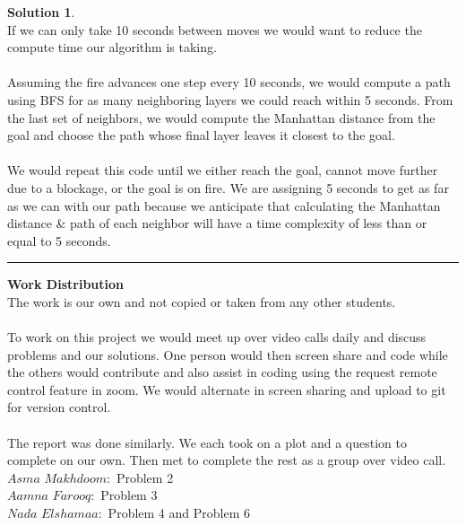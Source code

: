 \documentclass{article}
\theoremstyle{definition}
\def\fline{\rule{0.75\linewidth}{0.5pt}}
\newcommand{\finishline}{\vspace{-15pt}\begin{center}\fline\end{center}}
\newtheorem*{solution*}{Solution}
\newenvironment{solution}{\begin{solution*}}{{\finishline} \end{solution*}}
\begin{document}
\begin{solution} \hfill \\
     If we can only take 10 seconds between moves we would want to reduce the compute time our algorithm is taking. 
     \\\\
     Assuming the fire advances one step every 10 seconds, we would compute a path using BFS for as many neighboring layers we could reach within 5 seconds. From the last set of neighbors, we would compute the Manhattan distance from the goal and choose the path whose final layer leaves it closest to the goal. 
     \\\\
	 We would repeat this code until we either reach the goal, cannot move further due to a blockage, or the goal is on fire. 
	 We are assigning 5 seconds to get as far as we can with our path because we anticipate that calculating the Manhattan distance & path of each neighbor will have a time complexity of less than or equal to 5 seconds. 
	 
	 
\end{solution}

\textbf{Work Distribution}
\\
The work is our own and not copied or taken from any other students. 
\\\\
To work on this project we would meet up over video calls daily and discuss problems and our solutions. One person would then screen share and code while the others would contribute and also assist in coding using the request remote control feature in zoom. We would alternate in screen sharing and upload to git for version control. 
\\\\
The report was done similarly. We each took on a plot and a question to complete on our own. Then met to complete the rest as a group over video call. 
\\
$Asma$ $Makhdoom:$ Problem 2
\\
$Aamna$ $Farooq:$ Problem 3
\\
$Nada$ $Elshamaa:$ Problem 4 and Problem 6
\\
\smallskip
\end{document}
